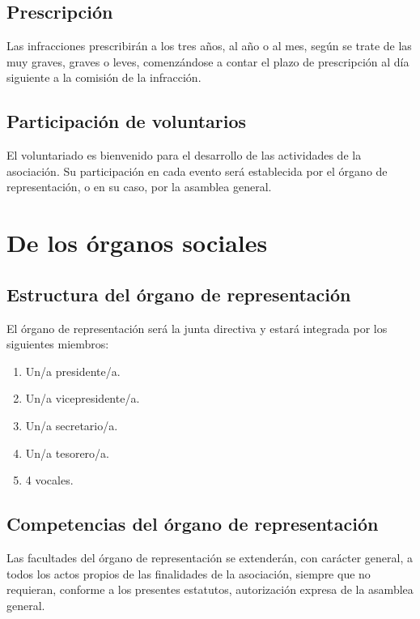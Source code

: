 \documentclass[a4paper, 12pt, oneside]{book}
\begin{document}
\section{Prescripción}

Las infracciones prescribirán a los tres años, al año o al mes, según se trate de las muy graves, graves o leves, comenzándose a contar el plazo de prescripción al día siguiente a la comisión de la infracción.

\section{Participación de voluntarios}

El voluntariado es bienvenido para el desarrollo de las actividades de la asociación. Su participación en cada evento será establecida por el órgano de representación, o en su caso, por la asamblea general.

\chapter{De los órganos sociales}

\section{Estructura del órgano de representación}

El órgano de representación será la junta directiva y estará integrada por los siguientes miembros:

\begin{enumerate}
    \item Un/a presidente/a.  
    \item Un/a vicepresidente/a.  
    \item Un/a secretario/a.  
    \item Un/a tesorero/a.  
    \item 4 vocales.      
\end{enumerate}

\section{Competencias del órgano de representación}

Las facultades del órgano de representación se extenderán, con carácter general, a todos los actos propios de las finalidades de la asociación, siempre que no requieran, conforme a los presentes estatutos, autorización expresa de la asamblea general.
\end{document}

